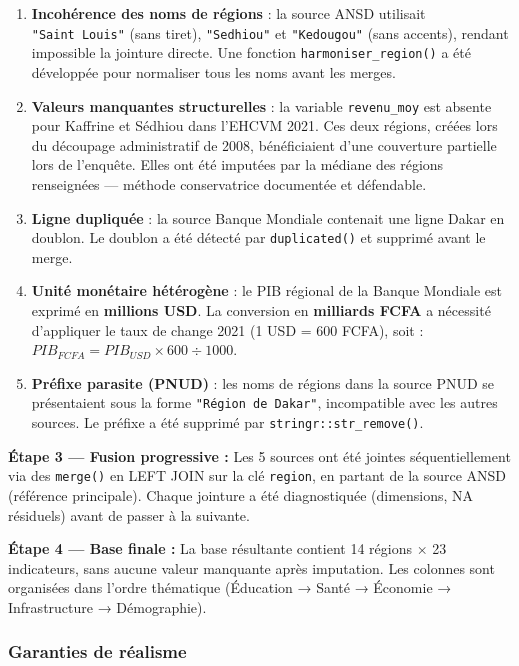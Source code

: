 \documentclass[
]{article}
\begin{document}
\begin{enumerate}
\def\labelenumi{\arabic{enumi}.}
\item
  \textbf{Incohérence des noms de régions} : la source ANSD utilisait
  \texttt{"Saint\ Louis"} (sans tiret), \texttt{"Sedhiou"} et
  \texttt{"Kedougou"} (sans accents), rendant impossible la jointure
  directe. Une fonction \texttt{harmoniser\_region()} a été développée
  pour normaliser tous les noms avant les merges.
\item
  \textbf{Valeurs manquantes structurelles} : la variable
  \texttt{revenu\_moy} est absente pour Kaffrine et Sédhiou dans l'EHCVM
  2021. Ces deux régions, créées lors du découpage administratif de
  2008, bénéficiaient d'une couverture partielle lors de l'enquête.
  Elles ont été imputées par la médiane des régions renseignées ---
  méthode conservatrice documentée et défendable.
\item
  \textbf{Ligne dupliquée} : la source Banque Mondiale contenait une
  ligne Dakar en doublon. Le doublon a été détecté par
  \texttt{duplicated()} et supprimé avant le merge.
\item
  \textbf{Unité monétaire hétérogène} : le PIB régional de la Banque
  Mondiale est exprimé en \textbf{millions USD}. La conversion en
  \textbf{milliards FCFA} a nécessité d'appliquer le taux de change 2021
  (1 USD = 600 FCFA), soit :
  \(PIB_{FCFA} = PIB_{USD} \times 600 \div 1000\).
\item
  \textbf{Préfixe parasite (PNUD)} : les noms de régions dans la source
  PNUD se présentaient sous la forme \texttt{"Région\ de\ Dakar"},
  incompatible avec les autres sources. Le préfixe a été supprimé par
  \texttt{stringr::str\_remove()}.
\end{enumerate}

\textbf{Étape 3 --- Fusion progressive :} Les 5 sources ont été jointes
séquentiellement via des \texttt{merge()} en LEFT JOIN sur la clé
\texttt{region}, en partant de la source ANSD (référence principale).
Chaque jointure a été diagnostiquée (dimensions, NA résiduels) avant de
passer à la suivante.

\textbf{Étape 4 --- Base finale :} La base résultante contient 14
régions × 23 indicateurs, sans aucune valeur manquante après imputation.
Les colonnes sont organisées dans l'ordre thématique (Éducation → Santé
→ Économie → Infrastructure → Démographie).

\subsubsection{Garanties de réalisme}\label{garanties-de-ruxe9alisme}
\end{document}
